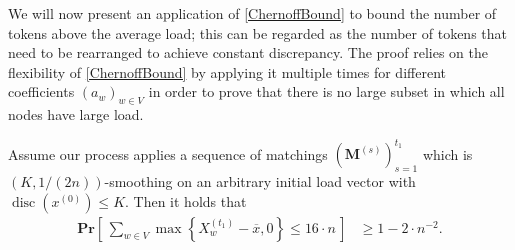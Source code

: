 \documentclass[twoside,leqno]{article}
\newcommand{\Pro}[1]{\mathbf{Pr} \left[\,#1\,\right]}
\newcommand{\M}{\mathbf{M}}
\DeclareMathOperator{\discr}{\mathrm{disc}}
\DeclareMathOperator{\1}{\mathbf{1}}
\numberwithin{equation}{section}
\begin{document}
We will now present an application of \cref{ChernoffBound} to bound the number of tokens above the average load; this can be regarded as the number of tokens that need to be rearranged to achieve constant discrepancy. The proof relies on the flexibility of \cref{ChernoffBound} by applying it multiple times for different coefficients $(a_w)_{w \in V}$ in order to prove that there is no large subset in which all nodes have large load.
\begin{lemma}\label{lem:toNToken}
Assume our process applies a sequence of matchings $\left(\M^{(s)}\right)_{s=1}^{t_1}$ which is
$(K, 1/(2n))$-smoothing on an arbitrary initial load vector with $\discr(x^{(0)})\le K$.
Then it holds that 
\begin{align*}
\Pro{ \sum_{w \in V} \max \left\{ X_w^{(t_1)} - \overline{x}, 0 \right\} \leq 16 \cdot n }&\geq 1-2\cdot n^{-2}.
\end{align*}
\end{lemma}
\end{document}
